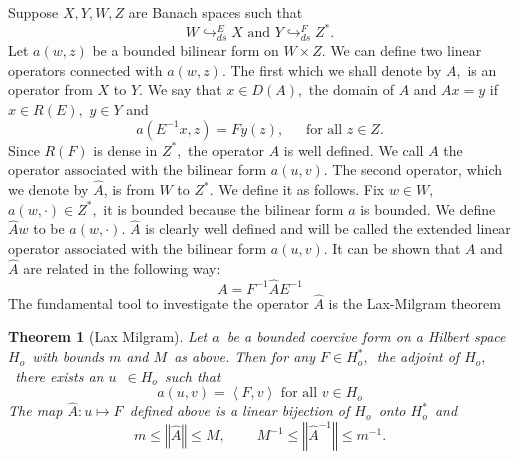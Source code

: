 \documentclass{article}
\newtheorem{theorem}{Theorem}
\begin{document}
Suppose $X,Y,W,Z$ are Banach spaces such that%
\begin{equation*}
W\hookrightarrow _{ds}^{E}X\text{ \ \ \ \ \ \ \ \ and \ \ \ \ \ \ \ \ }%
Y\hookrightarrow _{ds}^{F}Z^{\ast }.
\end{equation*}%
Let $a(w,z)$ be a bounded bilinear form on $W\times Z.$ We can define two
linear operators connected with $a(w,z).$ The first which we shall denote by 
$A,$ is an operator from $X$ to $Y.$ We say that $x\in D(A),$ the domain of $%
A$ and $Ax=y$ if $x\in R(E),$ $y\in Y$ and 
\begin{equation*}
a(E^{-1}x,z)=Fy(z),\ \ \ \ \ \ \ \text{for all }z\in Z.
\end{equation*}%
Since $R(F)$ is dense in $Z^{\ast },$ the operator $A$ is well defined. We
call $A$ the operator associated with the bilinear form $a(u,v).$\newline
The second operator, which we denote by $\hat{A}$, is from $W$ to $Z^{\ast
}. $ We define it as follows. Fix $w\in W,$ $a(w,\cdot )\in Z^{\ast },$ it
is bounded because the bilinear form $a$ is bounded. We define $\hat{A}w$ to
be $a(w,\cdot ).$ $\hat{A}$ is clearly well defined and will be called the
extended linear operator associated with the bilinear form $a(u,v).$ It can
be shown that $A$ and $\hat{A}$ are related in the following way:%
\begin{equation*}
A=F^{-1}\hat{A}E^{-1}
\end{equation*}%
The fundamental tool to investigate the operator $\hat{A}$ is the
Lax-Milgram theorem

\begin{theorem}[Lax Milgram]
\textit{Let }$a$\textit{\ be a bounded coercive form on a Hilbert space }$%
H_{o}$\textit{\ with bounds }$m$ \textit{and }$M$\textit{\ as above. Then
for any }$F\in H_{o}^{\ast },$\textit{\ the adjoint of }$H_{o},$\textit{\
there exists an }$u$\textit{\ }$\in H_{o}$\textit{\ such that }%
\begin{equation*}
a(u,v)=\left\langle F,v\right\rangle \text{ \ \ \ \ \ \ \ for all }v\in H_{o}
\end{equation*}%
\textit{The map }$\hat{A}:u\mapsto F$\textit{\ defined above is a linear
bijection of }$H_{o}$\textit{\ onto }$H_{o}^{\ast }$\textit{\ and }%
\begin{equation*}
m\leq \left\Vert \hat{A}\right\Vert \leq M,\ \ \ \ \ \ \ \ \ \ M^{-1}\leq
\left\Vert \hat{A}^{-1}\right\Vert \leq m^{-1}.
\end{equation*}
\end{theorem}
\end{document}
